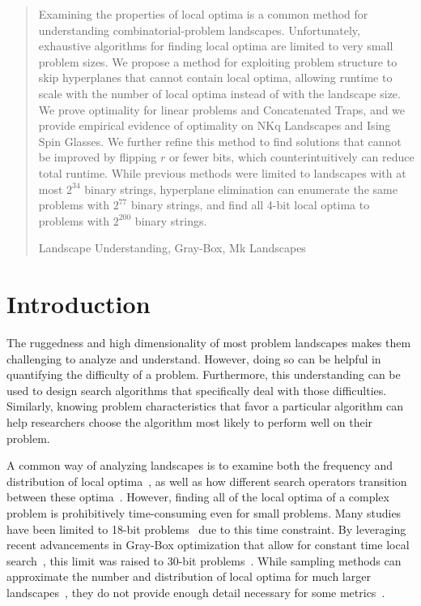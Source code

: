 \documentclass[runningheads,a4paper]{llncs}
\newcommand{\keywords}[1]{\par\addvspace\baselineskip
\noindent\keywordname\enspace\ignorespaces#1}
\begin{document}
\begin{abstract}
Examining the properties of local optima is a common method for understanding
combinatorial-problem landscapes.
Unfortunately,
exhaustive algorithms for finding local optima are limited to very small problem sizes.
We propose a method for exploiting problem structure
to skip hyperplanes
that cannot contain local optima, allowing runtime to scale with
the number of local optima instead of with the landscape size.
We prove optimality for linear problems and Concatenated Traps, and we provide
empirical evidence of optimality on NKq Landscapes and Ising Spin Glasses.
We further refine this method to find solutions
that cannot be improved by flipping $r$ or fewer bits, which counterintuitively
can reduce total runtime. While previous methods were limited to
landscapes with at most $2^{34}$ binary strings, hyperplane elimination can enumerate the same problems with
$2^{77}$ binary strings, and find all 4-bit local optima to problems with $2^{200}$ binary strings.



\keywords{Landscape Understanding, Gray-Box, Mk Landscapes}
\end{abstract}


\section{Introduction}
The ruggedness and high dimensionality of most problem landscapes makes them challenging to
analyze and understand. However, doing so can be helpful in
quantifying the difficulty of a problem. Furthermore,
this understanding can be used to design search algorithms that specifically deal
with those difficulties. 
Similarly, knowing problem characteristics that favor
a particular
algorithm can help researchers choose the algorithm
most likely to perform well on their problem.

A common way of analyzing landscapes is to
examine both the frequency and distribution of local optima~\cite{boese:1994:bigvalley},
as well as how different search operators transition between these
optima~\cite{tomassini:2008:nknetworks,verel:2011:nknetworks,ochoa:2015:crossovernetworks}.
However, finding all of the local optima of a complex problem is prohibitively time-consuming
even for small problems. Many studies have been limited to 18-bit
problems~\cite{tomassini:2008:nknetworks,verel:2011:nknetworks} due to this time constraint.
By leveraging recent advancements in Gray-Box optimization that allow for
constant time local search~\cite{chicano:2014:ball}, this limit was raised
to 30-bit problems~\cite{ochoa:2015:crossovernetworks}. While sampling
methods can approximate the number and distribution of local optima for much larger
landscapes~\cite{iclanzan:2014:somnetworks}, they do not provide enough
detail necessary for some metrics~\cite{ochoa:2015:crossovernetworks}.
\end{document}
